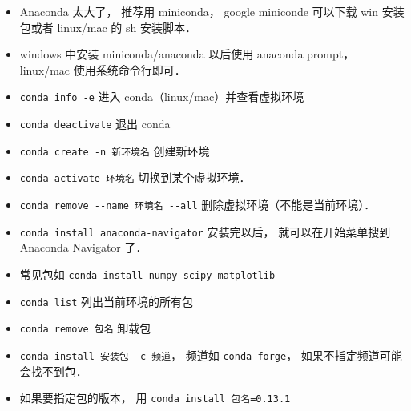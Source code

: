
\begin{itemize}
\item Anaconda 太大了， 推荐用 miniconda， google miniconde 可以下载 win 安装包或者 linux/mac 的 sh 安装脚本．
\item windows 中安装 miniconda/anaconda 以后使用 anaconda prompt， linux/mac 使用系统命令行即可．
\item \verb|conda info -e| 进入 conda（linux/mac）并查看虚拟环境
\item \verb|conda deactivate| 退出 conda
\item \verb|conda create -n 新环境名| 创建新环境
\item \verb|conda activate 环境名| 切换到某个虚拟环境．
\item \verb|conda remove --name 环境名 --all| 删除虚拟环境（不能是当前环境）．
\item \verb|conda install anaconda-navigator| 安装完以后， 就可以在开始菜单搜到 Anaconda Navigator 了．
\item 常见包如 \verb|conda install numpy scipy matplotlib|
\item \verb|conda list| 列出当前环境的所有包
\item \verb|conda remove 包名| 卸载包
\item \verb|conda install 安装包 -c 频道|， 频道如 \verb|conda-forge|， 如果不指定频道可能会找不到包．
\item 如果要指定包的版本， 用 \verb|conda install 包名=0.13.1|
\end{itemize}
